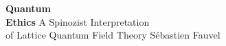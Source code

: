 \thispagestyle{empty}

\null
\vfill
\begin{center}
{\Huge \textbf{Quantum\\Ethics}}
\vskip 1.2cm
A Spinozist Interpretation\\
of Lattice Quantum Field Theory
\vskip 2cm
{\large Sébastien Fauvel}
\end{center}
\vfill
\null
